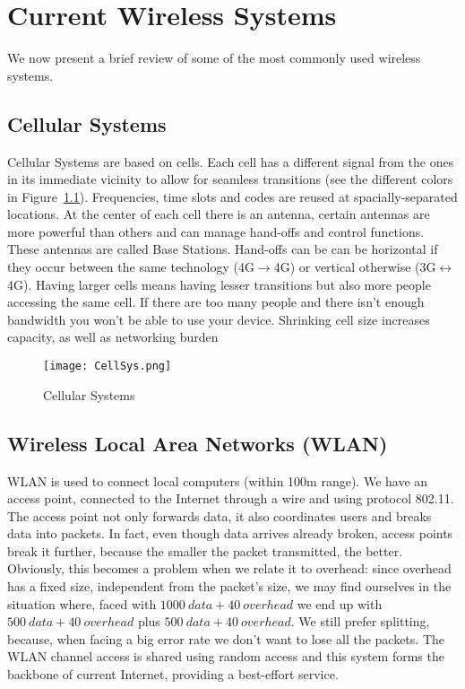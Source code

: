 \chapter{Current Wireless Systems}
We now present a brief review of some of the most commonly used wireless 
systems.

\section{Cellular Systems}
Cellular Systems are based on cells. Each cell has a different signal 
from the ones in its immediate vicinity to allow for seamless transitions (see 
the different colors in Figure~\ref{fig:cws:CellSys}). Frequencies, time 
slots and codes are reused at spacially-separated locations. At the center of 
each cell there is an antenna, certain antennas are more powerful than others 
and can manage hand-offs and control functions. These antennas are called Base 
Stations. Hand-offs can be can be horizontal if they occur between the same 
technology (4G$\to$4G) or vertical otherwise 
(3G$\leftrightarrow$4G).
Having larger cells means having lesser transitions but also more people 
accessing the same cell. If there are too many people and there isn't enough 
bandwidth you won't be able to use your device. Shrinking cell size increases 
capacity, as well as networking burden
\begin{figure}[!h]
  \centering
  \texttt{[image: CellSys.png]}
  \caption{Cellular Systems}				
  \label{fig:cws:CellSys}
\end{figure}

\section{Wireless Local Area Networks (WLAN)}
WLAN is used to connect local computers (within 100m range). We have an 
access point, connected to the Internet through a wire and using protocol 
802.11. The access point not only forwards data, it also coordinates users and 
breaks data into packets. In fact, even though data arrives already broken, 
access points break it further, because the smaller the packet transmitted, the 
better. Obviously, this becomes a problem when we relate it to overhead: since 
overhead has a fixed size, independent from the packet's size, we may find 
ourselves in the situation where, faced with $1000\ data + 40\ overhead$ we end
up with $500\ data + 40\ overhead$ plus $500\ data + 40\ overhead$.
We still prefer splitting, because, when facing a big error rate we 
don't want to lose all the packets.
The WLAN channel access is shared using random access and this system 
forms the backbone of current Internet, providing a best-effort service.

